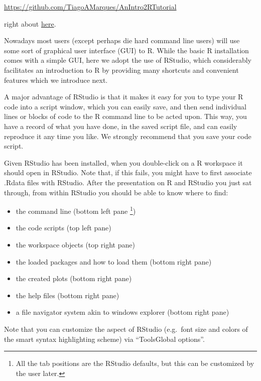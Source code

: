 \documentclass[
]{article}
\providecommand{\tightlist}{%
  \setlength{\itemsep}{0pt}\setlength{\parskip}{0pt}}
\begin{document}
\url{https://github.com/TiagoAMarques/AnIntro2RTutorial}

right about
\href{https://github.com/TiagoAMarques/AnIntro2RTutorial/blob/0db9070cb440ea591a74744c64c17e3022830f43/Quick\%20introduction\%20to\%20R\%20and\%20R\%20Studio.pptx}{here}.

Nowadays most users (except perhaps die hard command line users) will
use some sort of graphical user interface (GUI) to R. While the basic R
installation comes with a simple GUI, here we adopt the use of RStudio,
which considerably facilitates an introduction to R by providing many
shortcuts and convenient features which we introduce next.

A major advantage of RStudio is that it makes it easy for you to type
your R code into a script window, which you can easily save, and then
send individual lines or blocks of code to the R command line to be
acted upon. This way, you have a record of what you have done, in the
saved script file, and can easily reproduce it any time you like. We
strongly recommend that you save your code script.

Given RStudio has been installed, when you double-click on a R workspace
it should open in RStudio. Note that, if this fails, you might have to
first associate .Rdata files with RStudio. After the presentation on R
and RStudio you just sat through, from within RStudio you should be able
to know where to find:

\begin{itemize}
\tightlist
\item
  the command line (bottom left pane
  \footnote{All the tab positions are the RStudio defaults, but this can be customized by the user later.})
\item
  the code scripts (top left pane)
\item
  the workspace objects (top right pane)
\item
  the loaded packages and how to load them (bottom right pane)
\item
  the created plots (bottom right pane)
\item
  the help files (bottom right pane)
\item
  a file navigator system akin to windows explorer (bottom right pane)
\end{itemize}

Note that you can customize the aspect of RStudio (e.g.~font size and
colors of the smart syntax highlighting scheme) via
``Tools\textbar Global options''.
\end{document}
